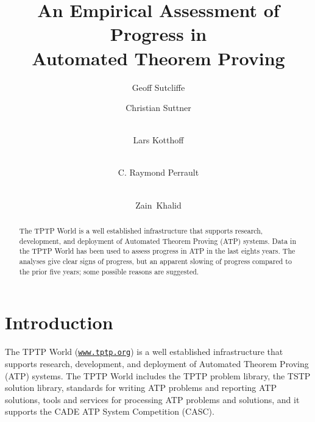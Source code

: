 \documentclass[runningheads]{llncs}
\begin{document}
\title{An Empirical Assessment of Progress in \\ Automated Theorem Proving}

\author{
Geoff Sutcliffe
\and
Christian Suttner
\and \\
Lars Kotthoff
\and \\
C. Raymond Perrault
\and \\
Zain~Khalid
}

\maketitle
\begin{abstract}
The TPTP World is a well established infrastructure that supports research, development, and 
deployment of Automated Theorem Proving (ATP) systems.
Data in the TPTP World has been used to assess progress in ATP in the last eights years.
The analyses give clear signs of progress, but an apparent slowing of progress compared to the
prior five years; some possible reasons are suggested.

\end{abstract}
\section{Introduction}
\label{Introduction}

The TPTP World \cite{Sut17} (\href{https://www.tptp.org}{\tt www.tptp.org}) is a well established 
infrastructure that supports research, development, and deployment of Automated Theorem Proving 
(ATP) systems.
The TPTP World includes the TPTP problem library,
the TSTP solution library,
standards for writing ATP problems and reporting ATP solutions,
tools and services for processing ATP problems and solutions,
and it supports the CADE ATP System Competition (CASC).
\end{document}
